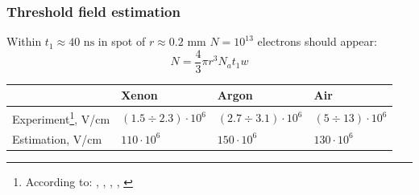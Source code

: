 \documentclass{beamer}
\begin{document}
	\begin{frame}
		\frametitle{Threshold field estimation}
		
		Within $t_1 \approx 40 \text{ ns}$ in spot of $r \approx 0.2$ mm $N = 10^{13}$ electrons should appear:
		$$N = \frac{4}{3} \pi r^3 N_a t_1 w$$
		\begin{center}
		\end{center}
		
		\footnotesize
		\begin{table}[]
			\begin{tabular}{llll}
				\hline
							     & Xenon            & Argon            & Air              \\ \hline
				Experiment\footnote{According to: \cite{raizer}, \cite{argon_threshold}, \cite{xenon_threshold}, \cite{air_breakdown}, \cite{air_threshold}}, V/cm & $(1.5 \div 2.3) \cdot 10^6$ & $(2.7 \div 3.1) \cdot 10^6$ & $(5 \div 13) \cdot 10^6$ \\
				Estimation, V/cm & $110 \cdot 10^6$ & $150 \cdot 10^6$ & $130 \cdot 10^6$ \\ \hline
			\end{tabular}
		\end{table}
	\end{frame}
	
\end{document}
